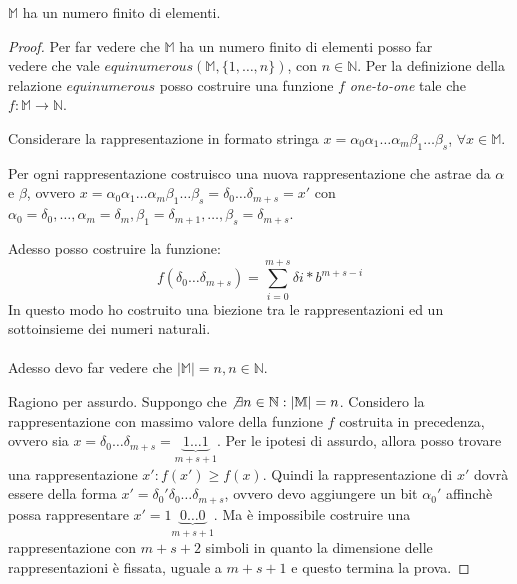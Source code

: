 \begin{exercise}[1.6]
$\mathbb{M}$ ha un numero finito di elementi.
\end{exercise}
\begin{proof}
Per far vedere che $\mathbb{M}$ ha un numero finito di elementi posso far \\
vedere che vale
$equinumerous(\mathbb{M}, \lbrace 1, \ldots, n\rbrace)$, con $n \in \mathbb{N}$.
Per la definizione della relazione $equinumerous$ posso costruire una funzione $f$
\emph{one-to-one} tale che $f: \mathbb{M} \rightarrow \mathbb{N}$.

Considerare la rappresentazione in formato stringa 
$x = \alpha_{0}\alpha_{1}\ldots\alpha_{m}\beta_{1}\ldots\beta_{s}$, $\forall x \in \mathbb{M}$.

Per ogni rappresentazione costruisco una nuova rappresentazione che astrae da $\alpha$ e $\beta$, 
ovvero $x = \alpha_{0}\alpha_{1}\ldots\alpha_{m}\beta_{1}\ldots\beta_{s} = \delta_{0} \ldots 
\delta_{m + s} = x'$
con $\alpha_{0} = \delta_{0}, \ldots, \alpha_{m} = \delta_{m}, \beta_{1} = \delta_{m + 1}, \ldots, 
\beta_{s} = \delta_{m + s}$.

Adesso posso costruire la funzione:
\begin{displaymath}
f(\delta_{0} \ldots \delta_{m + s}) = \sum_{i = 0}^{m + s}{\delta{i} * b^{m + s - i}}
\end{displaymath}
In questo modo ho costruito una biezione tra le rappresentazioni ed un sottoinsieme 
dei numeri naturali. \\\\
Adesso devo far vedere che $|\mathbb{M}| = n, n \in \mathbb{N}$.

Ragiono per assurdo. Suppongo che $\not \exists n \in \mathbb{N}: |\mathbb{M}| = n$.
Considero la rappresentazione con massimo valore della funzione $f$ costruita in precedenza,
ovvero sia $x = \delta_{0} \ldots \delta_{m + s} = \underbrace{1 \ldots 1}_{m+s+1}$.
Per le ipotesi di assurdo, allora posso trovare una rappresentazione $x':f(x') \geq f(x)$.
Quindi la rappresentazione di $x'$ dovr\`a essere della forma $x' = \delta_{0}' \delta_{0} 
\ldots \delta_{m + s}$,
ovvero devo aggiungere un bit $\alpha_{0}'$ affinch\`e possa rappresentare 
$x' = 1 \underbrace{0 \ldots 0}_{m+s+1}$. Ma \`e impossibile costruire una rappresentazione
con $m+s+2$ simboli in quanto la dimensione delle rappresentazioni \`e fissata, uguale a $m+s+1$ 
e questo termina la prova.

\end{proof}

